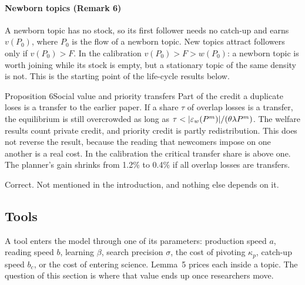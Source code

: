 \paragraph{Newborn topics (Remark 6)} A newborn topic has no stock, so its first follower needs no catch-up and earns $v(P_0)$, where $P_0$ is the flow of a newborn topic. New topics attract followers only if $v(P_0)>F$. In the calibration $v(P_0)>F>w(P_0)$: a newborn topic is worth joining while its stock is empty, but a stationary topic of the same density is not. This is the starting point of the life-cycle results below.

\begin{resultbox}{Proposition 6}{Social value and priority transfers}{\tminor}
Part of the credit a duplicate loses is a transfer to the earlier paper. If a share $\tau$ of overlap losses is a transfer, the equilibrium is still overcrowded as long as $\tau<|\eps_w(\Pm)|/(\theta\lambda\Pm)$.
\tcblower
\inwords The welfare results count private credit, and priority credit is partly redistribution. This does not reverse the result, because the reading that newcomers impose on one another is a real cost. In the calibration the critical transfer share is above one. The planner's gain shrinks from 1.2\% to 0.4\% if all overlap losses are transfers.

\review Correct. Not mentioned in the introduction, and nothing else depends on it.
\end{resultbox}

\subsection{Tools}\label{sec:results-tools}

A tool enters the model through one of its parameters: production speed $a$, reading speed $b$, learning $\beta$, search precision $\sigma$, the cost of pivoting $\kappa_p$, catch-up speed $b_c$, or the cost of entering science. Lemma~5 prices each inside a topic. The question of this section is where that value ends up once researchers move.

